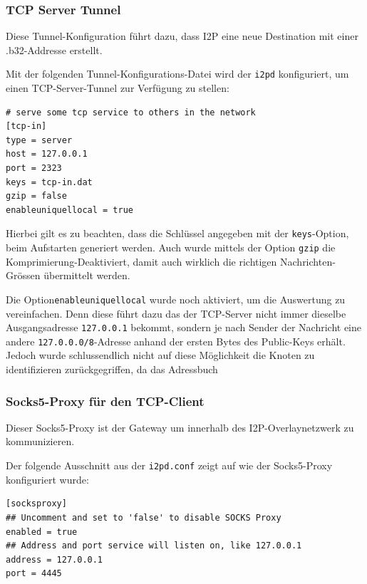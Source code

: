 \subsubsection{TCP Server Tunnel}

Diese Tunnel-Konfiguration führt dazu, dass I2P eine neue Destination mit einer .b32-Addresse erstellt.

Mit der folgenden Tunnel-Konfigurations-Datei wird der \lstinline|i2pd| konfiguriert, um einen TCP-Server-Tunnel zur Verfügung zu stellen:
\begin{lstlisting}
# serve some tcp service to others in the network
[tcp-in]
type = server
host = 127.0.0.1
port = 2323
keys = tcp-in.dat
gzip = false
enableuniquellocal = true
\end{lstlisting}

Hierbei gilt es zu beachten, dass die Schlüssel angegeben mit der \lstinline|keys|-Option, beim Aufstarten generiert werden.
Auch wurde mittels der Option \lstinline|gzip| die Komprimierung-Deaktiviert, damit auch wirklich die richtigen Nachrichten-Grössen übermittelt werden.

Die Option\lstinline|enableuniquellocal| wurde noch aktiviert, um die Auswertung zu vereinfachen. Denn diese führt dazu das der TCP-Server nicht immer dieselbe Ausgangsadresse \lstinline|127.0.0.1| bekommt, sondern je nach Sender der Nachricht eine andere \lstinline|127.0.0.0/8|-Adresse anhand der ersten Bytes des Public-Keys erhält. Jedoch wurde schlussendlich nicht auf diese Möglichkeit die Knoten zu identifizieren zurückgegriffen, da das Adressbuch 



\subsubsection{Socks5-Proxy für den TCP-Client}

Dieser Socks5-Proxy ist der Gateway um innerhalb des I2P-Overlaynetzwerk zu kommunizieren.

Der folgende Ausschnitt aus der \lstinline|i2pd.conf| zeigt auf wie der Socks5-Proxy konfiguriert wurde:

\begin{lstlisting}
[socksproxy]
## Uncomment and set to 'false' to disable SOCKS Proxy
enabled = true
## Address and port service will listen on, like 127.0.0.1
address = 127.0.0.1
port = 4445
\end{lstlisting}

